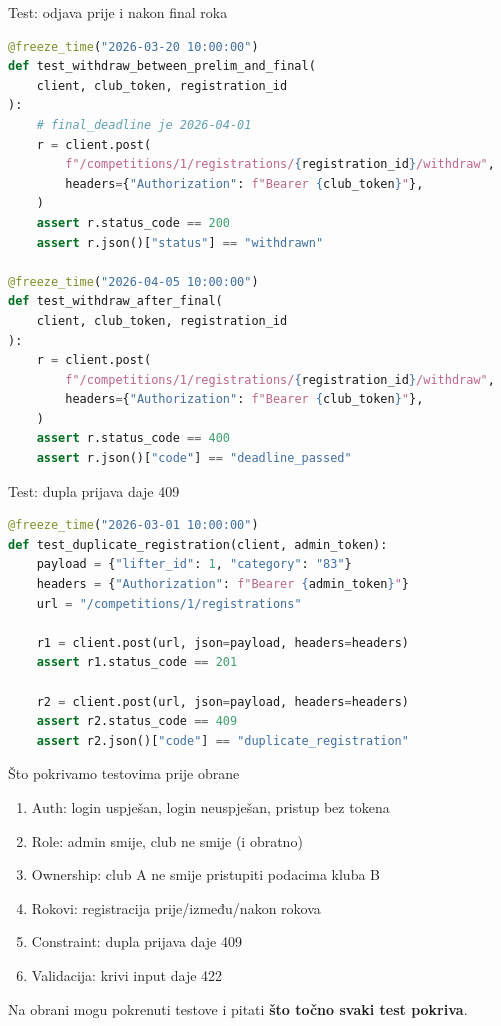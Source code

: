 \begin{frame}[fragile, shrink=5]{Test: odjava prije i nakon final roka}
\begin{lstlisting}[language=python]
@freeze_time("2026-03-20 10:00:00")
def test_withdraw_between_prelim_and_final(
    client, club_token, registration_id
):
    # final_deadline je 2026-04-01
    r = client.post(
        f"/competitions/1/registrations/{registration_id}/withdraw",
        headers={"Authorization": f"Bearer {club_token}"},
    )
    assert r.status_code == 200
    assert r.json()["status"] == "withdrawn"

@freeze_time("2026-04-05 10:00:00")
def test_withdraw_after_final(
    client, club_token, registration_id
):
    r = client.post(
        f"/competitions/1/registrations/{registration_id}/withdraw",
        headers={"Authorization": f"Bearer {club_token}"},
    )
    assert r.status_code == 400
    assert r.json()["code"] == "deadline_passed"
\end{lstlisting}
\end{frame}

\begin{frame}[fragile,shrink=5]{Test: dupla prijava daje 409}
\begin{lstlisting}[language=python]
@freeze_time("2026-03-01 10:00:00")
def test_duplicate_registration(client, admin_token):
    payload = {"lifter_id": 1, "category": "83"}
    headers = {"Authorization": f"Bearer {admin_token}"}
    url = "/competitions/1/registrations"

    r1 = client.post(url, json=payload, headers=headers)
    assert r1.status_code == 201

    r2 = client.post(url, json=payload, headers=headers)
    assert r2.status_code == 409
    assert r2.json()["code"] == "duplicate_registration"
\end{lstlisting}
\end{frame}

\begin{frame}{Što pokrivamo testovima prije obrane}
\begin{enumerate}
  \item Auth: login uspješan, login neuspješan, pristup bez tokena
  \item Role: admin smije, club ne smije (i obratno)
  \item Ownership: club A ne smije pristupiti podacima kluba B
  \item Rokovi: registracija prije/između/nakon rokova
  \item Constraint: dupla prijava daje 409
  \item Validacija: krivi input daje 422
\end{enumerate}

\vspace{0.6em}
Na obrani mogu pokrenuti testove i pitati \textbf{što točno svaki test pokriva}.
\end{frame}

